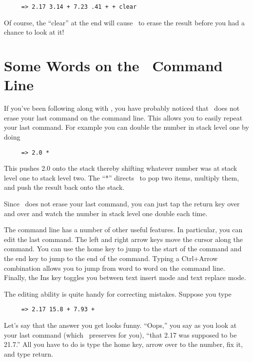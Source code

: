 \begin{verbatim}
     => 2.17 3.14 + 7.23 .41 + + clear
\end{verbatim}

Of course, the ``clear'' at the end will cause \CLAC\ to erase the result before you had a
chance to look at it!

\section{Some Words on the \CLAC\ Command Line}


If you've been following along with \CLAC, you have probably noticed that \CLAC\ does not erase
your last command on the command line. This allows you to easily repeat your last command. For
example you can double the number in stack level one by doing

\begin{verbatim}
     => 2.0 *
\end{verbatim}

This pushes 2.0 onto the stack thereby shifting whatever number was at stack level one to stack
level two. The ``*'' directs \CLAC\ to pop two items, multiply them, and push the result back
onto the stack.

Since \CLAC\ does not erase your last command, you can just tap the return key over and over and
watch the number in stack level one double each time.

The command line has a number of other useful features. In particular, you can edit the last
command. The left and right arrow keys move the cursor along the command. You can use the home
key to jump to the start of the command and the end key to jump to the end of the command.
Typing a Ctrl+Arrow combination allows you to jump from word to word on the command line.
Finally, the Ins key toggles you between text insert mode and text replace mode.

The editing ability is quite handy for correcting mistakes. Suppose you type

\begin{verbatim}
     => 2.17 15.8 + 7.93 +
\end{verbatim}

Let's say that the answer you get looks funny. ``Oops,'' you say as you look at your last
command (which \CLAC\ preserves for you), ``that 2.17 was supposed to be 21.7.'' All you have to
do is type the home key, arrow over to the number, fix it, and type return.

